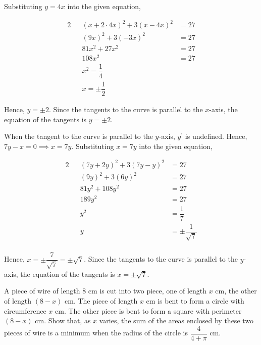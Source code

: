 \documentclass{jhwhw}
\begin{document}
                Substituting $y=4x$ into the given equation,

                \begin{alignat*}{2}
                    &&(x+2 \cdot 4x)^2 + 3(x-4x)^2 &= 27\\
                    &&(9x)^2 + 3(-3x)^2 &= 27\\
                    &&81x^2 + 27x^2 &= 27\\
                    &&108x^2 &= 27\\
                    &&x^2 = \dfrac14\\
                    &&x = \pm \dfrac12
                \end{alignat*}

                Hence, $y = \pm 2$. Since the tangents to the curve is parallel to the $x$-axis, the equation of the tangents is $y = \pm 2$.


            \subpart
                When the tangent to the curve is parallel to the $y$-axis, $y^\prime$ is undefined. Hence, $7y-x =0 \implies x = 7y$. Substituting $x = 7y$ into the given equation,

                \begin{alignat*}{2}
                    &&(7y+2y)^2 + 3(7y-y)^2 &= 27\\
                    &&(9y)^2 + 3(6y)^2 &= 27\\
                    &&81y^2 + 108y^2 &= 27\\
                    &&189y^2 &= 27\\
                    &&y^2 &= \dfrac17\\
                    &&y &= \pm \dfrac1{\sqrt7}\\
                \end{alignat*}

                Hence, $x = \pm \dfrac{7}{\sqrt7} = \pm \sqrt7$. Since the tangents to the curve is parallel to the $y$-axis, the equation of the tangents is $x = \pm \sqrt7$.


    \problem{}
        A piece of wire of length 8 cm is cut into two piece, one of length $x$ cm, the other of length $(8-x)$ cm. The piece of length $x$ cm is bent to form a circle with circumference $x$ cm. The other piece is bent to form a square with perimeter $(8-x)$ cm. Show that, as $x$ varies, the sum of the areas enclosed by these two pieces of wire is a minimum when the radius of the circle is $\dfrac4{4+\pi}$ cm.
\end{document}
